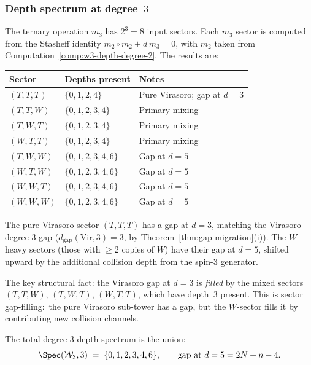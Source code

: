 \subsubsection{Depth spectrum at degree~$3$}
\label{subsubsec:w3-depth-degree-3}

\begin{computation}
\label{comp:w3-depth-degree-3}
%
The ternary operation $m_3$ has $2^3 = 8$ input sectors.
Each $m_3$ sector is computed from the Stasheff identity
$m_2 \circ m_2 + d\, m_3 = 0$, with
$m_2$ taken from Computation~\ref{comp:w3-depth-degree-2}.
The results are:

\begin{center}
\small
\renewcommand{\arraystretch}{1.3}
\begin{tabular}{lll}
\toprule
\textbf{Sector} & \textbf{Depths present} & \textbf{Notes} \\
\midrule
$(T,T,T)$ & $\{0, 1, 2, 4\}$ & Pure Virasoro; gap at $d = 3$ \\
$(T,T,W)$ & $\{0, 1, 2, 3, 4\}$ & Primary mixing \\
$(T,W,T)$ & $\{0, 1, 2, 3, 4\}$ & Primary mixing \\
$(W,T,T)$ & $\{0, 1, 2, 3, 4\}$ & Primary mixing \\
$(T,W,W)$ & $\{0, 1, 2, 3, 4, 6\}$ & Gap at $d = 5$ \\
$(W,T,W)$ & $\{0, 1, 2, 3, 4, 6\}$ & Gap at $d = 5$ \\
$(W,W,T)$ & $\{0, 1, 2, 3, 4, 6\}$ & Gap at $d = 5$ \\
$(W,W,W)$ & $\{0, 1, 2, 3, 4, 6\}$ & Gap at $d = 5$ \\
\bottomrule
\end{tabular}
\end{center}

\noindent
The pure Virasoro sector $(T,T,T)$ has a gap at $d = 3$,
matching the Virasoro degree-$3$ gap
($d_{\mathrm{gap}}(\mathrm{Vir}, 3) = 3$, by
Theorem~\ref{thm:gap-migration}(i)). The $W$-heavy
sectors (those with $\ge 2$ copies of $W$) have their
gap at $d = 5$, shifted upward by the additional collision
depth from the spin-$3$ generator.

The key structural fact: the Virasoro gap at $d = 3$ is
\emph{filled} by the mixed sectors $(T,T,W)$, $(T,W,T)$,
$(W,T,T)$, which have depth~$3$ present. This is
sector gap-filling:\ the pure Virasoro sub-tower has a gap,
but the $W$-sector fills it by contributing new collision
channels.

The total degree-$3$ depth spectrum is the union:
\begin{equation}
\label{eq:w3-spec-3}
\Spec(\mathcal{W}_3, 3)
\;=\; \{0, 1, 2, 3, 4, 6\},
\qquad
\text{gap at } d = 5 = 2N + n - 4.
\end{equation}
\end{computation}

